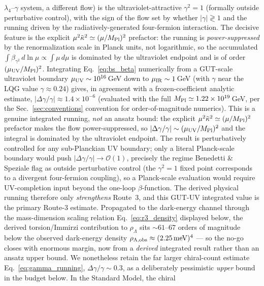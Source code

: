 \documentclass[aps,prd,twocolumn,superscriptaddress,showpacs,preprintnumbers,nofootinbib,longbibliography,floatfix]{revtex4-2}
\newcommand{\MPl}{M_{\rm Pl}}
\begin{document}
$\lambda_4$--$\gamma$ system, a different flow) is the
ultraviolet-attractive $\gamma^2=1$
(formally outside perturbative control), with the sign of the flow set by
whether $|\gamma|\gtrless 1$ and the running driven by the
radiatively-generated four-fermion interaction. The decisive feature is
the explicit $\mu^2\tilde\kappa^2\simeq(\mu/M_{\rm Pl})^2$ prefactor: the running is
\emph{power-suppressed} by the renormalization scale in Planck units, not
logarithmic, so the accumulated $\int\!\beta_{\gamma^2}\,d\ln\mu \propto
\int\!\mu\,d\mu$ is dominated by the ultraviolet endpoint and is of order
$(\mu_{\rm UV}/M_{\rm Pl})^2$. Integrating Eq.~\eqref{eq:bs_beta}
numerically from a GUT-scale ultraviolet boundary
$\mu_{\rm UV}\sim10^{16}\,$GeV down to $\mu_{\rm IR}\sim1\,$GeV (with
$\gamma$ near the LQG value $\gamma\!\approx\!0.24$) gives, in agreement
with a frozen-coefficient analytic estimate,
$|\Delta\gamma/\gamma|\approx1.4\times10^{-6}$ (evaluated with the full
$\MPl\simeq1.22\times10^{19}\,$GeV, per the Sec.~\ref{sec:conventions}
convention for order-of-magnitude numerics). This is a genuine integrated
running, \emph{not} an ansatz bound: the explicit
$\mu^2\tilde\kappa^2\simeq(\mu/M_{\rm Pl})^2$ prefactor makes the flow power-suppressed,
so $|\Delta\gamma/\gamma|\sim(\mu_{\rm UV}/M_{\rm Pl})^2$ and the integral is
dominated by the ultraviolet endpoint. The result is perturbatively
controlled for any sub-Planckian UV boundary; only a literal Planck-scale
boundary would push $|\Delta\gamma/\gamma|\to\mathcal{O}(1)$, precisely the
regime Benedetti \& Speziale flag as outside perturbative control (the
$\gamma^2=1$ fixed point corresponds to a divergent four-fermion coupling),
so a Planck-scale evaluation would require UV-completion input beyond the
one-loop $\beta$-function. The derived physical running therefore only
\emph{strengthens} Route~3, and this GUT-UV integrated value is the
primary Route-3 estimate. Propagated to the dark-energy channel through the mass-dimension
scaling relation Eq.~\eqref{eq:r3_density} displayed below, the
derived torsion/Immirzi contribution to $\rho_\Lambda$ sits
$\sim 61$--$67$ orders of magnitude below the observed dark-energy density
$\rho_{\Lambda,\rm obs}\approx(2.25\,\text{meV})^4$ --- so the no-go closes
with enormous margin, now from a \emph{derived} integrated result rather
than an ansatz upper bound. We nonetheless retain the far larger
chiral-count estimate Eq.~\eqref{eq:gamma_running},
$\Delta\gamma/\gamma\!\sim\!0.3$, as a deliberately pessimistic \emph{upper}
bound in the budget below. In the Standard Model, the chiral
\end{document}
